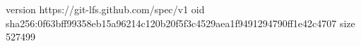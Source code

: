 version https://git-lfs.github.com/spec/v1
oid sha256:0f63bff99358eb15a96214c120b20f5f3c4529aea1f9491294790ff1e42c4707
size 527499
